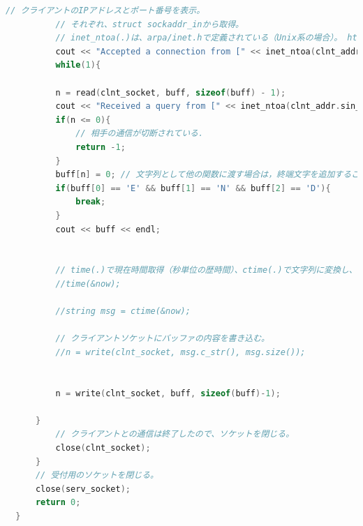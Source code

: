\documentclass[fleqn, a4paper. 12pt]{ltjsarticle}
\begin{document}
\begin{lstlisting}[language=C++]
          // クライアントのIPアドレスとポート番号を表示。
          // それぞれ、struct sockaddr_inから取得。
          // inet_ntoa(.)は、arpa/inet.hで定義されている（Unix系の場合）。 htons はエンディアンを変換する．
          cout << "Accepted a connection from [" << inet_ntoa(clnt_addr.sin_addr) << "," << htons(clnt_addr.sin_port) << "]" << endl;
          while(1){
  
          n = read(clnt_socket, buff, sizeof(buff) - 1);
          cout << "Received a query from [" << inet_ntoa(clnt_addr.sin_addr) << ", " << htons(clnt_addr.sin_port) << "]" << endl;
          if(n <= 0){
              // 相手の通信が切断されている．
              return -1;
          }
          buff[n] = 0; // 文字列として他の関数に渡す場合は，終端文字を追加することを忘れないように気をつける．
          if(buff[0] == 'E' && buff[1] == 'N' && buff[2] == 'D'){
              break;
          }
          cout << buff << endl;
          
          
          // time(.)で現在時間取得（秒単位の歴時間）、ctime(.)で文字列に変換し、送信バッファに書き込み。
          //time(&now);
  
          //string msg = ctime(&now);
  
          // クライアントソケットにバッファの内容を書き込む。
          //n = write(clnt_socket, msg.c_str(), msg.size());
  
  
          n = write(clnt_socket, buff, sizeof(buff)-1);
          
      }
          // クライアントとの通信は終了したので、ソケットを閉じる。
          close(clnt_socket);
      }
      // 受付用のソケットを閉じる。
      close(serv_socket);
      return 0;
  }
  
\end{lstlisting}
\end{document}
